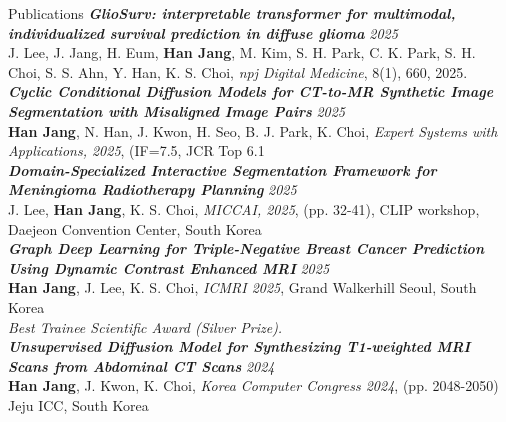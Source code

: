 \documentclass{resume}
\begin{document}
\begin{rSection}{Publications}
\textbf{\textit{GlioSurv: interpretable transformer for multimodal, individualized survival prediction in diffuse glioma}}%
\hfill \textit{2025} \\
\hspace*{1em} J. Lee, J. Jang, H. Eum, \textbf{Han Jang}, M. Kim, S. H. Park, C. K. Park, S. H. Choi, S. S. Ahn, Y. Han, K. S. Choi, \textit{npj Digital Medicine}, 8(1), 660, 2025.
\\[0.8em]

\textbf{\textit{Cyclic Conditional Diffusion Models for CT-to-MR Synthetic Image Segmentation with Misaligned Image Pairs}}%
\hfill \textit{2025} \\
\hspace*{1em} \textbf{Han Jang}, N. Han, J. Kwon, H. Seo, B. J. Park, K. Choi, \textit{Expert Systems with Applications, 2025}, (IF=7.5, JCR Top 6.1%
\\[0.8em]

\textbf{\textit{Domain-Specialized Interactive Segmentation Framework for Meningioma Radiotherapy Planning}}%
\hfill \textit{2025} \\
\hspace*{1em} J. Lee, \textbf{Han Jang}, K. S. Choi, \textit{MICCAI, 2025}, (pp. 32-41), CLIP workshop, Daejeon Convention Center, South Korea
\\[0.8em]

\textbf{\textit{Graph Deep Learning for Triple-Negative Breast Cancer Prediction Using Dynamic Contrast Enhanced MRI}}%
\hfill \textit{2025} \\
\hspace*{1em} \textbf{Han Jang}, J. Lee, K. S. Choi, \textit{ICMRI 2025}, Grand Walkerhill Seoul, South Korea
\\
\hspace*{1em} \textit{Best Trainee Scientific Award (Silver Prize).}
\\[0.8em]

\textbf{\textit{Unsupervised Diffusion Model for Synthesizing T1-weighted MRI Scans from Abdominal CT Scans}}%
\hfill \textit{2024} \\
\hspace*{1em} \textbf{Han Jang}, J. Kwon, K. Choi, \textit{Korea Computer Congress 2024}, (pp. 2048-2050) Jeju ICC, South Korea
\\[0.8em]

\end{rSection}
\end{document}
